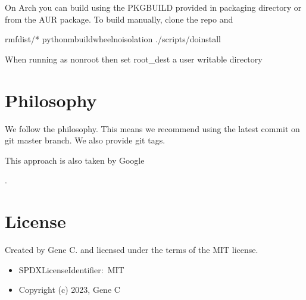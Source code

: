 \documentclass[letterpaper,10pt,english]{sphinxmanual}
\begin{document}
\sphinxAtStartPar
On Arch you can build using the PKGBUILD provided in packaging directory or from the AUR package.
To build manually, clone the repo and

\begin{sphinxVerbatim}[commandchars=\\\{\}]
rm\PYGZhy{}fdist/*
python\PYGZhy{}mbuild\PYGZhy{}\PYGZhy{}wheel\PYGZhy{}\PYGZhy{}no\PYGZhy{}isolation
./scripts/do\PYGZhy{}install
\end{sphinxVerbatim}

\sphinxAtStartPar
When running as non\sphinxhyphen{}root then set root\_dest a user writable directory


\section{Philosophy}
\label{\detokenize{README:philosophy}}
\sphinxAtStartPar
We follow the  philosophy. This means we recommend using the
latest commit on git master branch. We also provide git tags.

\sphinxAtStartPar
This approach is also taken by Google %
\begin{footnote}[1]\sphinxAtStartFootnote
{}
%
\end{footnote} %
\begin{footnote}[2]\sphinxAtStartFootnote
{}
%
\end{footnote}.


\section{License}
\label{\detokenize{README:license}}
\sphinxAtStartPar
Created by Gene C. and licensed under the terms of the MIT license.
\begin{itemize}
\item {} 
\sphinxAtStartPar
SPDX\sphinxhyphen{}License\sphinxhyphen{}Identifier: MIT

\item {} 
\sphinxAtStartPar
Copyright (c) 2023, Gene C

\end{itemize}

\sphinxstepscope
\end{document}
